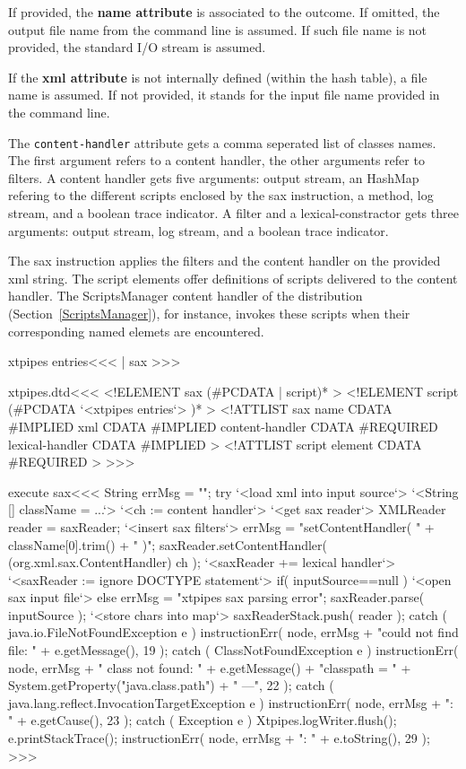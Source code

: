 \documentclass{article}
\begin{document}
{If provided, the {\bf name attribute} is associated to the outcome.
If omitted, the output file name from the command line is assumed. If
such file name is not provided, the standard I/O stream is assumed.

If the {\bf xml attribute} is not internally defined (within the hash
table), a file name is assumed.  If not provided, it stands for the
input file name provided in the command line.

The \verb+content-handler+ attribute gets a comma seperated list of
classes names. The first argument refers to a content handler, the
other arguments refer to filters. A content handler gets five
arguments: output stream, an HashMap refering to the different scripts
enclosed by the sax instruction, a method, log stream, and a boolean
trace indicator.  A filter and a lexical-constractor gets three
arguments: output stream, log stream, and a boolean trace indicator.

The sax instruction applies the filters and the content handler on the
provided xml string.  The script elements offer definitions of scripts
delivered to the content handler. The ScriptsManager content handler
of the distribution (Section~\ref{ScriptsManager}), for instance,
invokes these scripts when their corresponding named elemets are
encountered.


\<xtpipes entries\><<<
| sax
>>>


\<xtpipes.dtd\><<<
<!ELEMENT sax (#PCDATA | script)*  >  
<!ELEMENT script (#PCDATA `<xtpipes entries`> )*  >  
<!ATTLIST sax
          name            CDATA #IMPLIED
          xml             CDATA #IMPLIED
          content-handler CDATA #REQUIRED 
          lexical-handler CDATA #IMPLIED
>
<!ATTLIST script
          element CDATA #REQUIRED
>
>>>

\<execute sax\><<<
String errMsg = "";
try{ 
   `<load xml into input source`>
   `<String [] className = ...`>
   `<ch := content handler`>
   `<get sax reader`>
   XMLReader reader = saxReader;
   `<insert sax filters`>
   errMsg = "setContentHandler( " 
            + className[0].trim() + " )";
   saxReader.setContentHandler( (org.xml.sax.ContentHandler) ch );
   `<saxReader += lexical handler`>
   `<saxReader := ignore DOCTYPE statement`>
   if( inputSource==null ){
       `<open sax input file`>
   } else {
       errMsg = "xtpipes sax parsing error";
       saxReader.parse( inputSource );
   }
   `<store chars into map`>
   saxReaderStack.push( reader );
} catch ( java.io.FileNotFoundException e ){ 
   instructionErr( node, errMsg 
                   + "could not find file: " + e.getMessage(), 19 );  
} catch ( ClassNotFoundException e ){ 
   instructionErr( node, errMsg 
                   + " class not found: "
                   + e.getMessage() + "\n classpath = "
                   + System.getProperty("java.class.path")
                   + " ---", 22 );  
} catch ( java.lang.reflect.InvocationTargetException e ){ 
   instructionErr( node, errMsg + ": " + e.getCause(), 23 );  
} catch ( Exception e ){ 
   Xtpipes.logWriter.flush();
   e.printStackTrace();
   instructionErr( node, errMsg + ": " + e.toString(), 29 );  
}
>>>

}
\end{document}

